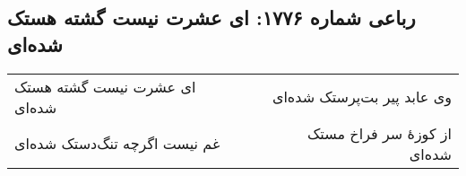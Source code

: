 \begin{center}
\section*{رباعی شماره ۱۷۷۶: ای عشرت نیست گشته هستک شده‌ای}
\label{sec:1776}
\begin{longtable}{l p{0.5cm} r}
ای عشرت نیست گشته هستک شده‌ای
&&
وی عابد پیر بت‌پرستک شده‌ای
\\
غم نیست اگرچه تنگ‌دستک شده‌ای
&&
از کوزهٔ سر فراخ مستک شده‌ای
\\
\end{longtable}
\end{center}
